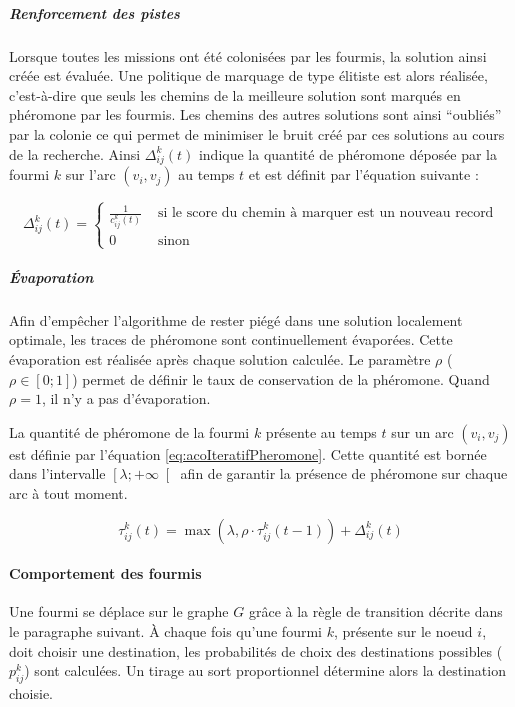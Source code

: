 \subparagraph{Renforcement des pistes\\}

Lorsque toutes les missions ont été colonisées par les fourmis, la solution ainsi créée est évaluée. Une politique de marquage de type élitiste est alors réalisée, c'est-à-dire que seuls les chemins de la meilleure solution sont marqués en phéromone par les fourmis. Les chemins des autres solutions sont ainsi ``oubliés'' par la colonie ce qui permet de minimiser le bruit créé par ces solutions au cours de la recherche. Ainsi $\Delta^k_{ij}(t)$ indique la quantité de phéromone déposée par la fourmi $k$ sur l'arc $(v_i,v_j)$ au temps $t$ et est définit par l'équation suivante :

\begin{equation}\label{eq:acoIteratif:renforcement}
 \Delta^k_{ij}(t) = 
 \begin{cases}
    \frac{1}{c^k_{ij}(t)} & \text{ si le score du chemin à marquer est un nouveau record}\\
    0 & \text{ sinon}
 \end{cases}
\end{equation}

\subparagraph{Évaporation\\}

Afin d'empêcher l'algorithme de rester piégé dans une solution localement optimale, les traces de phéromone sont continuellement évaporées. Cette évaporation est réalisée après chaque solution calculée. Le paramètre $\rho$ ($\rho \in [0;1]$) permet de définir le taux de conservation de la phéromone. Quand $\rho = 1$, il n'y a pas d'évaporation.

La quantité de phéromone de la fourmi $k$ présente au temps $t$ sur un arc $(v_i,v_j)$ est définie par l'équation \ref{eq:acoIteratifPheromone}. Cette quantité est bornée dans l'intervalle $\left[\lambda ; +\infty\right[$ afin de garantir la présence de phéromone sur chaque arc à tout moment.

\begin{equation}\label{eq:acoIteratifPheromone}
 \tau^k_{ij}(t) = \max \left(\lambda , \rho \cdot \tau^k_{ij}(t-1) \right) + \Delta^k_{ij}(t)
\end{equation}

\paragraph{Comportement des fourmis}

Une fourmi se déplace sur le graphe $G$ grâce à la règle de transition décrite dans le paragraphe suivant. À chaque fois qu'une fourmi $k$, présente sur le noeud $i$, doit choisir une destination, les probabilités de choix des destinations possibles ($p^k_{ij}$) sont calculées. Un tirage au sort proportionnel détermine alors la destination choisie. 

